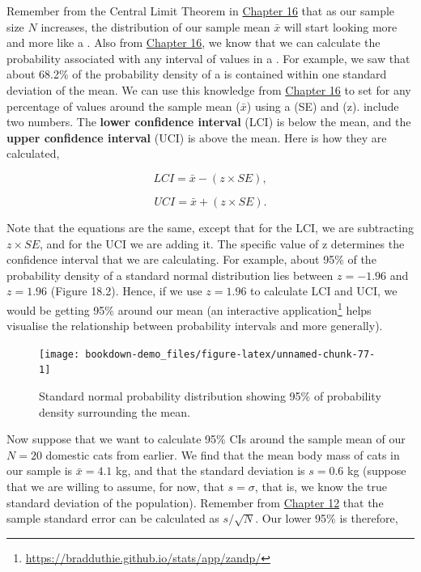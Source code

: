 \documentclass[
  openany]{krantz}
\begin{document}
Remember from the Central Limit Theorem in \protect\hyperlink{Chapter_16}{Chapter 16} that as our sample size \(N\) increases, the distribution of our sample mean \(\bar{x}\) will start looking more and more like a .
Also from \protect\hyperlink{Chapter_16}{Chapter 16}, we know that we can calculate the probability associated with any interval of values in a .
For example, we saw that about 68.2\% of the probability density of a  is contained within one standard deviation of the mean.
We can use this knowledge from \protect\hyperlink{Chapter_16}{Chapter 16} to set  for any percentage of values around the sample mean (\(\bar{x}\)) using a  (SE) and  (z).
 include two numbers.
The \textbf{lower confidence interval} (LCI) is below the mean, and the \textbf{upper confidence interval} (UCI) is above the mean.
Here is how they are calculated,

\[LCI = \bar{x} - (z \times SE),\]

\[UCI = \bar{x} + (z \times SE).\]

Note that the equations are the same, except that for the LCI, we are subtracting \(z \times SE\), and for the UCI we are adding it.
The specific value of z determines the confidence interval that we are calculating.
For example, about 95\% of the probability density of a standard normal distribution lies between \(z = -1.96\) and \(z = 1.96\) (Figure 18.2).
Hence, if we use \(z = 1.96\) to calculate LCI and UCI, we would be getting 95\%  around our mean (an interactive application\footnote{\url{https://bradduthie.github.io/stats/app/zandp/}} helps visualise the relationship between probability intervals and  more generally).

\begin{figure}
\texttt{[image: bookdown-demo\_files/figure-latex/unnamed-chunk-77-1]} \caption{Standard normal probability distribution showing 95\% of probability density surrounding the mean.}\label{fig:unnamed-chunk-77}
\end{figure}

Now suppose that we want to calculate 95\% CIs around the sample mean of our \(N = 20\) domestic cats from earlier.
We find that the mean body mass of cats in our sample is \(\bar{x} = 4.1\) kg, and that the standard deviation is \(s = 0.6\) kg (suppose that we are willing to assume, for now, that \(s = \sigma\), that is, we know the true standard deviation of the population).
Remember from \protect\hyperlink{Chapter_12}{Chapter 12} that the sample standard error can be calculated as \(s / \sqrt{N}\).
Our lower 95\%  is therefore,
\end{document}
